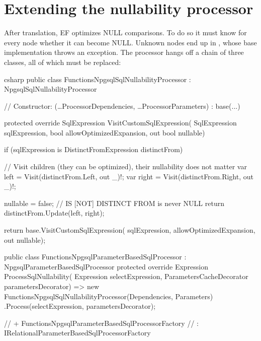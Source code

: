 \section{Extending the nullability processor}

After translation, EF optimizes NULL comparisons. To do so it must know for every node
whether it can become NULL. Unknown nodes end up in
, whose base
implementation throws an exception. The processor hangs off a chain of three classes, all of
which must be replaced:

\begin{sourcecode}{csharp}
public class FunctionsNpgsqlSqlNullabilityProcessor : NpgsqlSqlNullabilityProcessor
{
    // Constructor: (…ProcessorDependencies, …ProcessorParameters) : base(...)

    protected override SqlExpression VisitCustomSqlExpression(
        SqlExpression sqlExpression, bool allowOptimizedExpansion, out bool nullable)
    {
        if (sqlExpression is DistinctFromExpression distinctFrom)
        {
            // Visit children (they can be optimized), their nullability does not matter
            var left = Visit(distinctFrom.Left, out _)!;
            var right = Visit(distinctFrom.Right, out _)!;

            nullable = false;                   // IS [NOT] DISTINCT FROM is never NULL
            return distinctFrom.Update(left, right);
        }

        return base.VisitCustomSqlExpression(
            sqlExpression, allowOptimizedExpansion, out nullable);
    }
}

public class FunctionsNpgsqlParameterBasedSqlProcessor : NpgsqlParameterBasedSqlProcessor
{
    protected override Expression ProcessSqlNullability(
        Expression selectExpression, ParametersCacheDecorator parametersDecorator)
        => new FunctionsNpgsqlSqlNullabilityProcessor(Dependencies, Parameters)
            .Process(selectExpression, parametersDecorator);
}

// + FunctionsNpgsqlParameterBasedSqlProcessorFactory
//   : IRelationalParameterBasedSqlProcessorFactory
\end{sourcecode}


